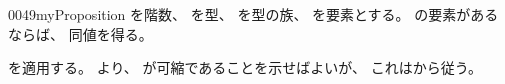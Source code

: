 \documentclass[index]{subfiles}
\begin{document}
\begin{myBlock}{0049}{myProposition}
  を階数、
  を型、
  を型の族、
  を要素とする。
  の要素があるならば、
  同値を得る。
\end{myBlock}
\begin{myProof}
  を適用する。
  より、
  が可縮であることを示せばよいが、
  これはから従う。
\end{myProof}
\end{document}
